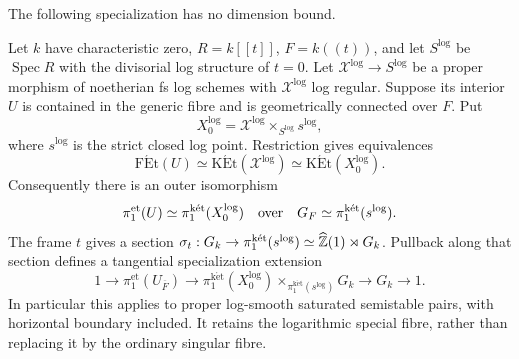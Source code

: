 The following specialization has no dimension bound.

\begin{theorem}\label{A6-log-specialization}
Let $k$ have characteristic zero, $R=k[[t]]$, $F=k((t))$, and let $S^{\log}$ be $\operatorname{Spec}R$ with the divisorial log structure of $t=0$. Let $\mathcal X^{\log}\to S^{\log}$ be a proper morphism of noetherian fs log schemes with $\mathcal X^{\log}$ log regular. Suppose its interior $U$ is contained in the generic fibre and is geometrically connected over $F$. Put
\[
 X_0^{\log}=\mathcal X^{\log}\times_{S^{\log}}s^{\log},
\]
where $s^{\log}$ is the strict closed log point. Restriction gives equivalences
\[
 \operatorname{F\acute Et}(U)
 \simeq\operatorname{K\acute Et}(\mathcal X^{\log})
 \simeq\operatorname{K\acute Et}(X_0^{\log}).
\]
Consequently there is an outer isomorphism
\[
 \pi_1^{\mathrm{et}}(U)\simeq
 \pi_1^{\mathrm{k\acute et}}(X_0^{\log})
 \quad\hbox{over}\quad
 G_F\simeq\pi_1^{\mathrm{k\acute et}}(s^{\log}).
\]
The frame $t$ gives a section
$\sigma_t:G_k\to\pi_1^{\mathrm{k\acute et}}(s^{\log})
\simeq\widehat{{\mathbb{Z}}}(1)\rtimes G_k$. Pullback along that section defines a tangential specialization extension
\[
 1\longrightarrow\pi_1^{\mathrm{et}}(U_{\overline{F}})
 \longrightarrow
 \pi_1^{\mathrm{k\acute et}}(X_0^{\log})
       \times_{\pi_1^{\mathrm{k\acute et}}(s^{\log})}G_k
 \longrightarrow G_k\longrightarrow1.
\]
In particular this applies to proper log-smooth saturated semistable pairs, with horizontal boundary included. It retains the logarithmic special fibre, rather than replacing it by the ordinary singular fibre.
\end{theorem}
